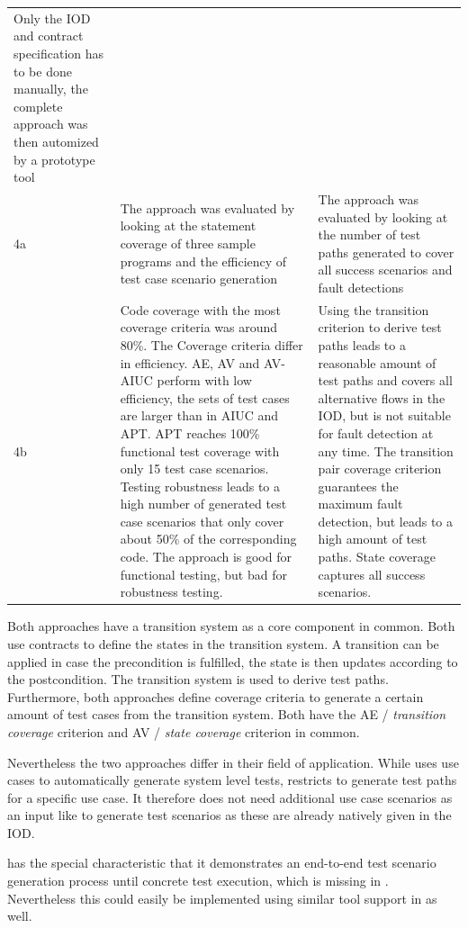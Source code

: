 \begin{longtable}[h]{p{0.5cm}p{}p{}}
	Only the IOD and contract specification has to be done manually, the complete approach was then automized by a prototype tool \\
	4a & 
	The approach was evaluated by looking at the statement coverage of three sample programs and the efficiency of test case scenario generation & 
	The approach was evaluated by looking at the number of test paths generated to cover all success scenarios and fault detections \\
	4b &
	Code coverage with the most coverage criteria was around 80\%. The Coverage criteria differ in efficiency. AE, AV and AV-AIUC perform with low efficiency, the sets of test cases are larger than in AIUC and APT. APT reaches 100\% functional test coverage with only 15 test case scenarios. Testing robustness leads to a high number of generated test case scenarios that only cover about 50\% of the corresponding code. The approach is good for functional testing, but bad for robustness testing. &
	Using the transition criterion to derive test paths leads to a reasonable amount of test paths and covers all alternative flows in the IOD, but is not suitable for fault detection at any time. The transition pair coverage criterion guarantees the maximum fault detection, but leads to a high amount of test paths. State coverage captures all success scenarios. \\
\end{longtable}

Both approaches have a transition system as a core component in common. Both use contracts to define the states in the transition system. A transition can be applied in case the precondition is fulfilled, the state is then updates according to the postcondition. The transition system is used to derive test paths. Furthermore, both approaches define coverage criteria to generate a certain amount of test cases from the transition system. Both have the AE / \textit{transition coverage} criterion and AV / \textit{state coverage} criterion in common. 

Nevertheless the two approaches differ in their field of application. While \cite{ClementineNebut2006} uses use cases to automatically generate system level tests, \cite{NajlaRaza2007} restricts to generate test paths for a specific use case. It therefore does not need additional use case scenarios as an input like \cite{ClementineNebut2006} to generate test scenarios as these are already natively given in the IOD. 

\cite{ClementineNebut2006} has the special characteristic that it demonstrates an end-to-end test scenario generation process until concrete test execution, which is missing in \cite{NajlaRaza2007}. Nevertheless this could easily be implemented using similar tool support in \cite{NajlaRaza2007} as well. 

